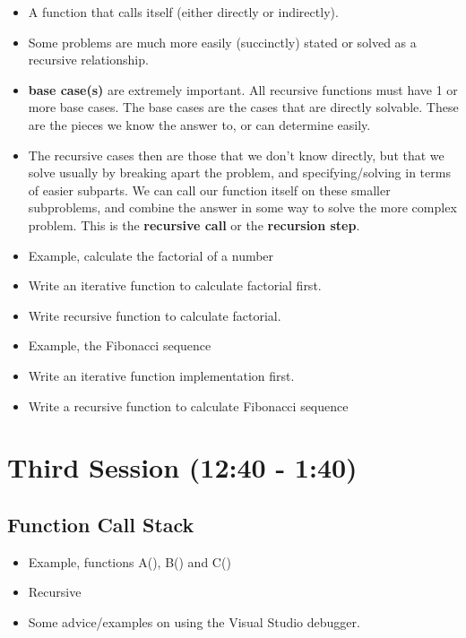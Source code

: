 \documentclass[11pt]{article}
\begin{document}
\begin{itemize}
\item A function that calls itself (either directly or indirectly).
\item Some problems are much more easily (succinctly) stated or solved as a
  recursive relationship.
\item \textbf{base case(s)} are extremely important.  All recursive functions must have 
  1 or more base cases.  The base cases are the cases that are directly solvable.
  These are the pieces we know the answer to, or can determine easily.
\item The recursive cases then are those that we don't know directly, but that we solve
  usually by breaking apart the problem, and specifying/solving in terms of easier
  subparts.  We can call our function itself on these smaller subproblems, and combine
  the answer in some way to solve the more complex problem.  This is the
  \textbf{recursive call} or the \textbf{recursion step}.
\item Example, calculate the factorial of a number
\item Write an iterative function to calculate factorial first.
\item Write recursive function to calculate factorial.
\item Example, the Fibonacci sequence
\item Write an iterative function implementation first.
\item Write a recursive function to calculate Fibonacci sequence
\end{itemize}
\section{Third Session (12:40 - 1:40)}
\label{sec-3}
\subsection{Function Call Stack}
\label{sec-3-1}

\begin{itemize}
\item Example, functions A(), B() and C()
\item Recursive
\item Some advice/examples on using the Visual Studio debugger.
\end{itemize}
\end{document}
